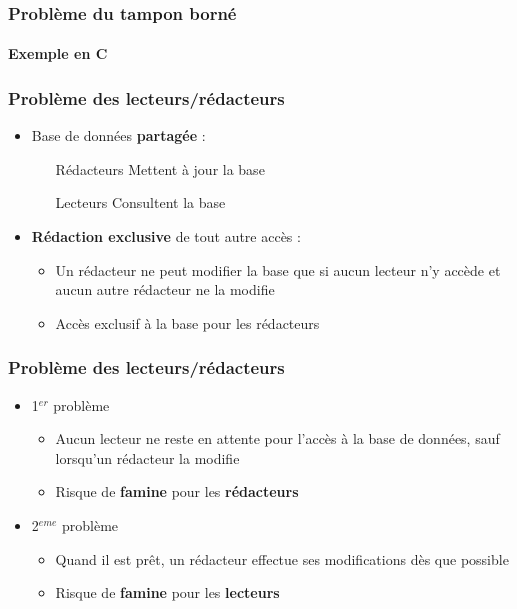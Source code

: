 \begin{frame}
\frametitle{Problème du tampon borné}
\framesubtitle{Exemple en C}
\begin{multicols}{2}
\begin{scriptsize}\end{scriptsize}
\end{multicols}
\end{frame}


\begin{frame}
\frametitle{Problème des lecteurs/rédacteurs}
\begin{itemize}
\item Base de données \textbf{partagée} :
\begin{itemize}
\item [Rédacteurs] Mettent à jour la base
\item [Lecteurs] Consultent la base
\end{itemize}
\item \textbf{Rédaction exclusive} de tout autre accès :
\begin{itemize}
\item Un rédacteur ne peut modifier la base que si aucun lecteur n’y accède et aucun autre rédacteur ne la modifie
\item Accès exclusif à la base pour les rédacteurs
\end{itemize}
\end{itemize}
\end{frame}

\begin{frame}
\frametitle{Problème des lecteurs/rédacteurs}
\begin{itemize}
\item <1-> 1$^{er}$ problème
\begin{itemize}
\item Aucun lecteur ne reste en attente pour l’accès à la base de données, sauf lorsqu’un rédacteur la modifie
\item Risque de \textbf{famine} pour les \textbf{rédacteurs}
\end{itemize}
\item <2-> 2$^{eme}$ problème
\begin{itemize}
\item Quand il est prêt, un rédacteur effectue ses modifications dès que possible
\item Risque de \textbf{famine} pour les \textbf{lecteurs}
\end{itemize}
\end{itemize}
\end{frame}

